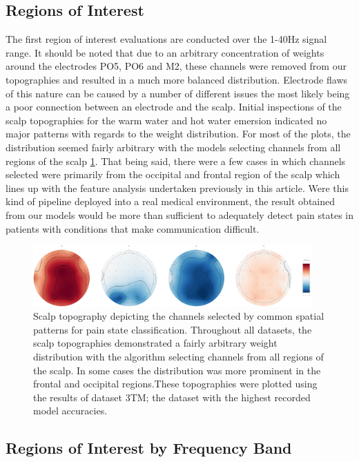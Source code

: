 \documentclass[11pt]{article}
\begin{document}
\subsection{Regions of Interest}

The first region of interest evaluations are conducted over the 1-40Hz signal range. It should be noted that due to an arbitrary concentration of weights around the electrodes PO5, PO6 and M2, these channels were removed from our topographies and resulted in a much more balanced distribution. Electrode flaws of this nature can be caused by a number of different issues the most likely being a poor connection between an electrode and the scalp. Initial inspections of the scalp topographies for the warm water and hot water emersion indicated no major patterns with regards to the weight distribution. For most of the plots, the distribution seemed fairly arbitrary with the models selecting channels from all regions of the scalp \ref{fig:3TM_WW}. That being said, there were a few cases in which channels selected were primarily from the occipital and frontal region of the scalp which lines up with the feature analysis undertaken previously in this article. Were this kind of pipeline deployed into a real medical environment, the result obtained from our models would be more than sufficient to adequately detect pain states in patients with conditions that make communication difficult. 

\begin{figure}[tb]
\centering
\includegraphics[width=0.95\textwidth]{3TM_WW.png}
\caption{\label{fig:3TM_WW}
Scalp topography depicting the channels selected by common spatial patterns for pain state classification. Throughout all datasets, the scalp topographies demonstrated a fairly arbitrary weight distribution with the algorithm selecting channels from all regions of the scalp. In some cases the distribution was more prominent in the frontal and occipital regions.These topographies were plotted using the results of dataset 3TM; the dataset with the highest recorded model accuracies.}
\end{figure} 

\subsection{Regions of Interest by Frequency Band}
\end{document}
